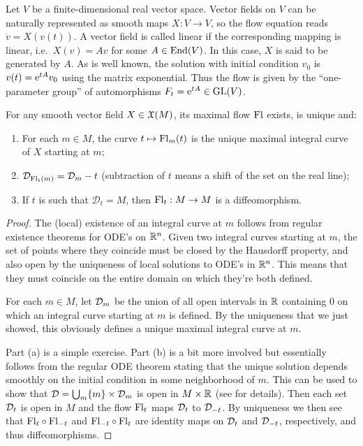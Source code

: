 \begin{example}
    Let $V$ be a finite-dimensional real vector space.  Vector fields on $V$ can be naturally represented as smooth maps $X:V\to V$, so the flow equation reads $\dot v=X(v(t))$. A vector field is called linear if the corresponding mapping is linear, i.e.~$X(v)=Av$ for some $A\in\operatorname{End}(V)$. In this case, $X$ is said to be generated by $A$. As is well known, the solution with initial condition $v_0$ is $v(t)=\mathrm{e}^{tA}v_0$ using the matrix exponential. Thus the flow is given by the ``one-parameter group'' of automorphisms $F_t=\mathrm{e}^{tA}\in \operatorname{GL}(V)$.
\end{example}

\begin{thm}\label{thm fundamental of flows}
    For any smooth vector field $X\in\mathfrak{X}(M)$, its maximal flow $\mathrm{Fl}$ exists, is unique and:
    \begin{enumerate}
        \item For each $m\in M$, the curve $t\mapsto \mathrm{Fl}_m(t)$ is the unique maximal integral curve of $X$ starting at $m$;
        \item $\mathcal{D}_{\mathrm{Fl}_t(m)}=\mathcal{D}_m-t$ (subtraction of $t$ means a shift of the set on the real line);
        \item If $t$ is such that $\mathcal{D}_t=M$, then $\mathrm{Fl}_t:M\to M$ is a diffeomorphism.
    \end{enumerate}
\end{thm}
\begin{proof}
    The (local) existence of an integral curve at $m$ follows from regular existence theorems for ODE's on $\mathbb{R}^n$. Given two integral curves starting at $m$, the set of points where they coincide must be closed by the Hausdorff property, and also open by the uniqueness of local solutions to ODE's in $\mathbb{R}^n$. This means that they must coincide on the entire domain on which they're both defined.

    For each $m\in M$, let $\mathcal{D}_m$ be the union of all open intervals in $\mathbb{R}$ containing $0$ on which an integral curve starting at $m$ is defined. By the uniqueness that we just showed, this obviously defines a unique maximal integral curve at $m$.

    Part (a) is a simple exercise. Part (b) is a bit more involved but essentially follows from the regular ODE theorem stating that the unique solution depends smoothly on the initial condition in some neighborhood of $m$. This can be used to show that $\mathcal{D}=\bigcup_m \{m\}\times \mathcal{D}_m$ is open in $M\times\mathbb{R}$ (see \cite[Thm.~9.12]{Lee} for details). Then each set $\mathcal{D}_t$ is open in $M$ and the flow $\mathrm{Fl}_t$ maps $\mathcal{D}_t$ to $\mathcal{D}_{-t}$. By uniqueness we then see that $\mathrm{Fl}_t\circ \mathrm{Fl}_{-t}$ and $\mathrm{Fl}_{-t}\circ \mathrm{Fl}_t$ are identity maps on $\mathcal{D}_t$ and $\mathcal{D}_{-t}$, respectively, and thus diffeomorphisms.
\end{proof}



